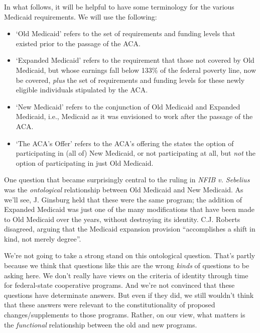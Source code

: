 \documentclass[
  11pt,
  letterpaper,
  DIV=11,
  numbers=noendperiod,
  oneside]{scrartcl}
\begin{document}
In what follows, it will be helpful to have some terminology for the
various Medicaid requirements. We will use the following:

\begin{itemize}
\item
  `Old Medicaid' refers to the set of requirements and funding levels
  that existed prior to the passage of the ACA.
\item
  `Expanded Medicaid' refers to the requirement that those not covered
  by Old Medicaid, but whose earnings fall below 133\% of the federal
  poverty line, now be covered, \emph{plus} the set of requirements and
  funding levels for these newly eligible individuals stipulated by the
  ACA.
\item
  `New Medicaid' refers to the conjunction of Old Medicaid and Expanded
  Medicaid, i.e., Medicaid as it was envisioned to work after the
  passage of the ACA.
\item
  `The ACA's Offer' refers to the ACA's offering the states the option
  of participating in (all of) New Medicaid, or not participating at
  all, but \emph{not} the option of participating in just Old Medicaid.
\end{itemize}

One question that became surprisingly central to the ruling in
\emph{NFIB v. Sebelius} was the \emph{ontological} relationship between
Old Medicaid and New Medicaid. As we'll see, J. Ginsburg held that these
were the same program; the addition of Expanded Medicaid was just one of
the many modifications that have been made to Old Medicaid over the
years, without destroying its identity.
C.J. Roberts disagreed, arguing that the Medicaid expansion provision
``accomplishes a shift in kind, not merely degree''.

We're not going to take a strong stand on this ontological question.
That's partly because we think that questions like this are the wrong
\emph{kinds} of questions to be asking here. We don't really have views
on the criteria of identity through time for federal-state cooperative
programs. And we're not convinced that these questions have determinate
answers. But even if they did, we still wouldn't think that these
answers were relevant to the constitutionality of proposed
changes/supplements to those programs. Rather, on our view, what matters
is the \emph{functional} relationship between the old and new programs.
\end{document}
